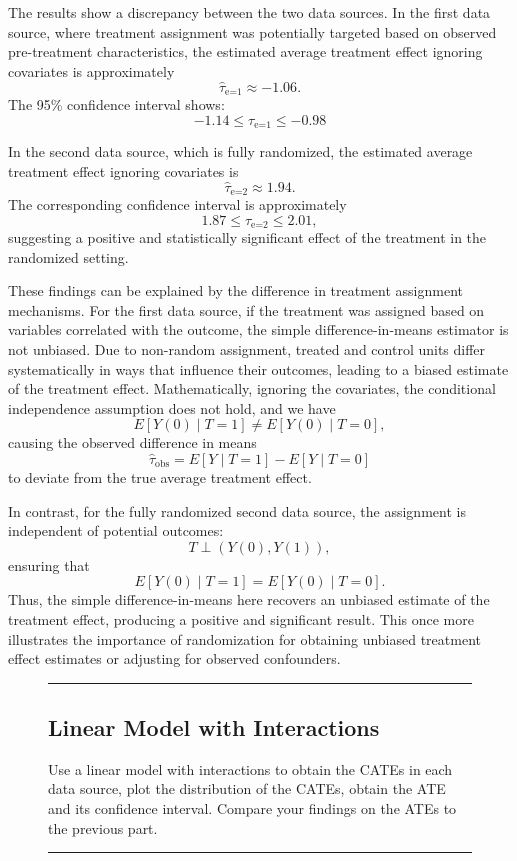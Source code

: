 \documentclass{article}
\newenvironment{colorparagraph}[1]{\par\color{#1}}{\par}
\begin{document}
The results show a discrepancy between the two data sources. In the first data source, where treatment assignment was potentially targeted based on observed pre-treatment characteristics, the estimated average treatment effect ignoring covariates is approximately 
\[
\widehat{\tau}_{\text{e=1}} \approx -1.06.
\]
The 95\% confidence interval shows:
\[
-1.14 \leq \tau_{\text{e=1}} \leq -0.98
\]

In the second data source, which is fully randomized, the estimated average treatment effect ignoring covariates is 
\[
\widehat{\tau}_{\text{e=2}} \approx 1.94.
\]
The corresponding confidence interval is approximately 
\[
1.87 \leq \tau_{\text{e=2}} \leq 2.01,
\]
suggesting a positive and statistically significant effect of the treatment in the randomized setting.

These findings can be explained by the difference in treatment assignment mechanisms. For the first data source, if the treatment was assigned based on variables correlated with the outcome, the simple difference-in-means estimator is not unbiased. Due to non-random assignment, treated and control units differ systematically in ways that influence their outcomes, leading to a biased estimate of the treatment effect. Mathematically, ignoring the covariates, the conditional independence assumption does not hold, and we have
\[
E[Y(0)\mid T=1] \neq E[Y(0)\mid T=0],
\]
causing the observed difference in means 
\[
\widehat{\tau}_{\text{obs}} = E[Y\mid T=1] - E[Y\mid T=0]
\]
to deviate from the true average treatment effect.

In contrast, for the fully randomized second data source, the assignment is independent of potential outcomes:
\[
T \perp (Y(0), Y(1)),
\]
ensuring that
\[
E[Y(0)\mid T=1] = E[Y(0)\mid T=0].
\]
Thus, the simple difference-in-means here recovers an unbiased estimate of the treatment effect, producing a positive and significant result. This once more illustrates the importance of randomization for obtaining unbiased treatment effect estimates or adjusting for observed confounders.

\begin{figure}[H]
  \begin{colorparagraph}{questioncolor}
  \rule{\textwidth}{0.5pt}
  \label{q3b}
  \subsection{Linear Model with Interactions}

  Use a linear model with interactions to obtain the CATEs in each data source, plot the distribution of the CATEs, obtain the ATE and its confidence interval. Compare your findings on the ATEs to the previous part.

  \rule{\textwidth}{0.5pt}
  \end{colorparagraph}
\end{figure}
\end{document}
